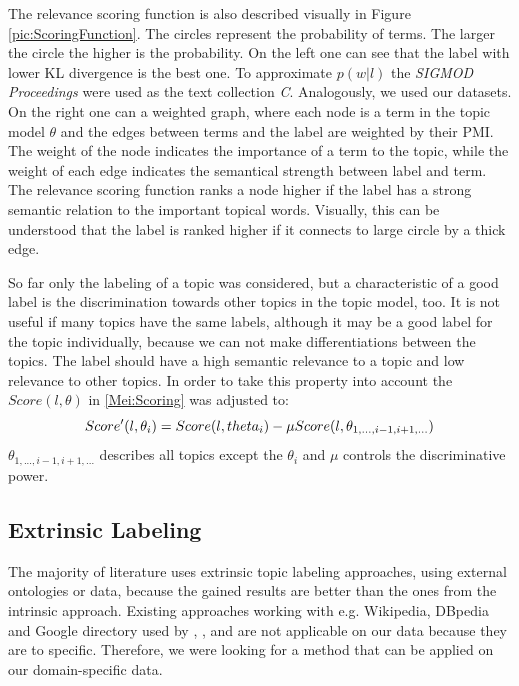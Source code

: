 The relevance scoring function is also described visually in Figure \ref{pic:ScoringFunction}. The circles represent the probability of terms. The larger the circle the higher is the probability. On the left one can see that the label with lower \ac{KL} divergence is the best one. To approximate $p(w|l)$ the \textit{SIGMOD Proceedings} were used as the text collection \textit{C}. Analogously, we used our datasets. On the right one can a weighted graph, where each node is a term in the topic model $\theta$ and the edges between terms and the label are weighted by their \ac{PMI}. The weight of the node indicates the importance of a term to the topic, while the weight of each edge indicates the semantical strength between label and term. The relevance scoring function ranks a node higher if the label has a strong semantic relation to the important topical words. Visually, this can be understood that the label is ranked higher if it connects to large circle by a thick edge.

So far only the labeling of a topic was considered, but a characteristic of a good label is the discrimination towards other topics in the topic model, too. It is not useful if many topics have the same labels, although it may be a good label for the topic individually, because we can not make differentiations between the topics. The label should have a high semantic relevance to a topic and low relevance to other topics. In order to take this property into account the $Score(l,\theta)$ in \ref{Mei:Scoring} was adjusted to: 
\begin{equation}
Score'(l,\theta_{i}) = Score(l,\\theta_{i}) - \mu Score(l,\theta_{1,...,i-1,i+1,...})
\end{equation}
$\theta_{1,...,i-1,i+1,...}$ describes all topics except the $\theta_{i}$ and $\mu$ controls the discriminative power.


\newpage
\subsection{Extrinsic Labeling}
\label{sec:extrinsic}
The majority of literature uses extrinsic topic labeling approaches, using external ontologies or data, because the gained results are better than the ones from the intrinsic approach. Existing approaches working with e.g. Wikipedia, DBpedia and Google directory used by \textit{\cite{Lau2011}}, \textit{\cite{Hulpus2013}}, \textit{\cite{Bhatia2016}} and \textit{\cite{Magatti2009}} are not applicable on our data because they are to specific. Therefore, we were looking for a method that can be applied on our domain-specific data.

